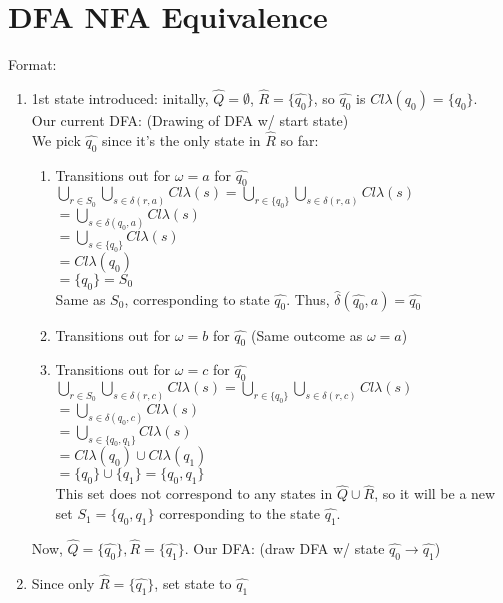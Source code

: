 \documentclass{article}
\begin{document}
\section*{DFA NFA Equivalence}
Format:
\begin{enumerate}
    \item 1st state introduced: initally, $\hat{Q}=\emptyset$, $\hat{R}=\{\hat{q_0}\}$, so $\hat{q_0}$ is $Cl\lambda(q_0)=\{q_0\}$. \\
    Our current DFA: (Drawing of DFA w/ start state) \\
    We pick $\hat{q_0}$ since it's the only state in $\hat{R}$ so far:
    \begin{enumerate}
        \item Transitions out for $\omega=a$ for $\hat{q_0}$ \\
        $\bigcup_{r\in S_0}\bigcup_{s\in\delta(r,a)}Cl\lambda(s)=\bigcup_{r\in \{q_0\}}\bigcup_{s\in\delta(r,a)}Cl\lambda(s)$ \\
        $=\bigcup_{s\in\delta(q_0,a)}Cl\lambda(s)$ \\
        $=\bigcup_{s\in\{q_0\}}Cl\lambda(s)$ \\
        $=Cl\lambda(q_0)$ \\
        $=\{q_0\} = S_0$ \\
        Same as $S_0$, corresponding to state $\hat{q_0}$. Thus, $\hat{\delta}(\hat{q_0},a)=\hat{q_0}$
        \item Transitions out for $\omega=b$ for $\hat{q_0}$ (Same outcome as $\omega=a$)
        \item Transitions out for $\omega=c$ for $\hat{q_0}$ \\
        $\bigcup_{r\in S_0}\bigcup_{s\in\delta(r,c)}Cl\lambda(s)=\bigcup_{r\in \{q_0\}}\bigcup_{s\in\delta(r,c)}Cl\lambda(s)$ \\
        $=\bigcup_{s\in\delta(q_0,c)}Cl\lambda(s)$ \\
        $=\bigcup_{s\in\{q_0,q_1\}}Cl\lambda(s)$ \\
        $=Cl\lambda(q_0)\cup Cl\lambda(q_1)$ \\
        $=\{q_0\}\cup\{q_1\}=\{q_0,q_1\}$ \\
        This set does not correspond to any states in $\hat{Q}\cup\hat{R}$, so it will be a new set $S_1=\{q_0,q_1\}$ corresponding to the state
        $\hat{q_1}$.
    \end{enumerate}
    Now, $\hat{Q}=\{\hat{q_0}\},\hat{R}=\{\hat{q_1}\}$. Our DFA: (draw DFA w/ state $\hat{q_0}\rightarrow\hat{q_1}$)
    \item Since only $\hat{R}=\{\hat{q_1}\}$, set state to $\hat{q_1}$

\end{enumerate}
\end{document}

